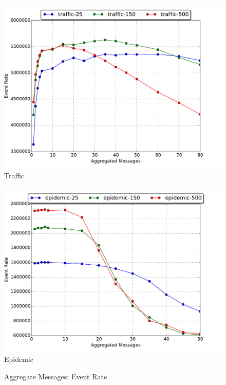 \documentclass[11pt]{book}
\begin{document}
\begin{figure}
\begin{minipage}{.5\textwidth}
\begin{center}
      \includegraphics[width=\textwidth,keepaspectratio,quiet]{figs/partitioning_communication/aggregate_traffic_eventrate.pdf} \\
      Traffic \\
    \end{center}
  \end{minipage}
  \centering
  \begin{minipage}{.5\textwidth}
    \begin{center}
      \includegraphics[width=\textwidth,keepaspectratio,quiet]{figs/partitioning_communication/aggregate_epidemic_eventrate.pdf} \\
      Epidemic \\
    \end{center}
  \end{minipage}
  \caption{Aggregate Messages: Event Rate}\label{aggregate_eventrate}
\end{figure}
\end{document}
